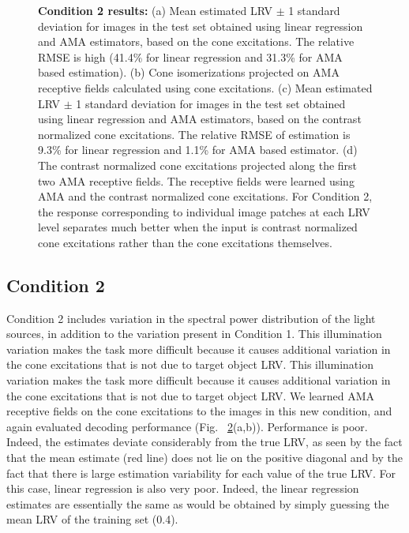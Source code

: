 \documentclass{jov}
\begin{document}
\begin{figure}
\begin{subfigure}[b]{0.22 \textwidth}
        \label{fig:case2RFResponseContrast}
    \end{subfigure}
    \caption{{\bf Condition 2 results:} (a) Mean estimated LRV $\pm$ 1 standard deviation for images in the test set obtained using linear regression and AMA estimators, based on the cone excitations. The relative RMSE is high (41.4\% for linear regression and 31.3\% for AMA based estimation). (b) Cone isomerizations projected on AMA receptive fields calculated using cone excitations. (c) Mean estimated LRV $\pm$ 1 standard deviation for images in the test set obtained using linear regression and AMA estimators, based on the contrast normalized cone excitations. The relative RMSE of estimation is 9.3\% for linear regression and 1.1\% for AMA based estimator. (d) The contrast normalized cone excitations projected along the first two AMA receptive fields. The receptive fields were learned using AMA and the contrast normalized cone excitations. For Condition 2, the response corresponding to individual image patches at each LRV level separates much better when the input is contrast normalized cone excitations rather than the cone excitations themselves.}
\label{fig:Condition2}
\end{figure}

\subsection{Condition 2}

Condition 2 includes variation in the spectral power distribution of the light sources, in addition to the variation present in Condition 1. 
This illumination variation makes the task more difficult because it causes additional variation in the cone excitations that is not due to target object LRV.
This illumination variation makes the task more difficult because it causes additional variation in the cone excitations that is not due to target object LRV. 
We learned AMA receptive fields on the cone excitations to the images in this new condition, and again evaluated decoding performance (Fig. ~\ref{fig:Condition2}(a,b)). 
Performance is poor.
Indeed, the estimates deviate considerably from the true LRV, as seen by the fact that the mean estimate
(red line) does not lie on the positive diagonal and by the fact that there is large estimation variability for each
value of the true LRV.
For this case, linear regression is also very poor. Indeed, the linear regression estimates are essentially the same as would be obtained
by simply guessing the mean LRV of the training set (0.4).
\end{document}
